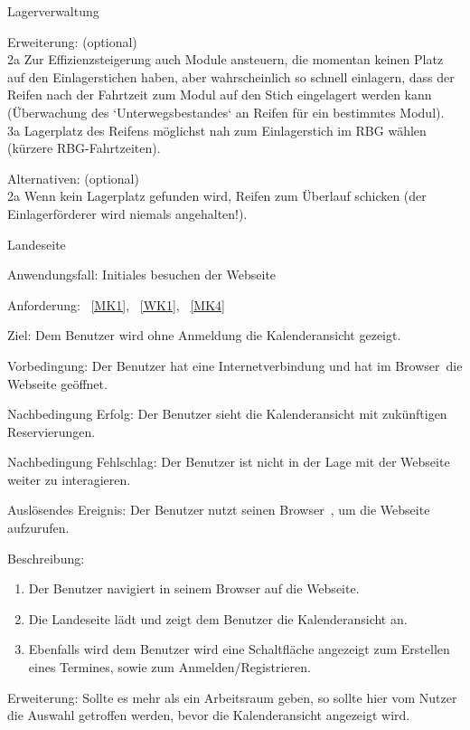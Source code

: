\begin{function}{10}{Lagerverwaltung}
\begin{enumerate}
    \end{enumerate}
    \item[Erweiterung:] (optional)\\
        2a Zur Effizienzsteigerung auch Module ansteuern, die momentan keinen Platz auf
        den Einlagerstichen haben, aber wahrscheinlich so schnell einlagern, dass der
        Reifen nach der Fahrtzeit zum Modul auf den Stich eingelagert werden kann
        (Überwachung des `Unterwegsbestandes` an Reifen für ein bestimmtes
        Modul).\\
        3a Lagerplatz des Reifens möglichst nah zum Einlagerstich im RBG wählen	(kürzere RBG-Fahrtzeiten).
    \item[Alternativen:] (optional)\\
        2a Wenn kein Lagerplatz gefunden wird, Reifen zum Überlauf schicken (der
        Einlagerförderer wird niemals angehalten!).
\end{function}
\fi

\begin{function}{10}{Landeseite}
    \item[Anwendungsfall:] Initiales besuchen der Webseite
    \item[Anforderung:]~\ref{MK1}, ~\ref{WK1}, ~\ref{MK4}
    \item[Ziel:] Dem Benutzer wird ohne Anmeldung die Kalenderansicht gezeigt.
    \item[Vorbedingung:] Der Benutzer hat eine Internetverbindung und hat im \gls{Browser}~die Webseite geöffnet.
    \item[Nachbedingung Erfolg:] Der Benutzer sieht die Kalenderansicht mit zukünftigen Reservierungen.
    \item[Nachbedingung Fehlschlag:] Der Benutzer ist nicht in der Lage mit der Webseite weiter zu interagieren.
    \item[Auslösendes Ereignis:] Der Benutzer nutzt seinen \gls{Browser}~, um die Webseite aufzurufen.
    \item[Beschreibung:]~
    \begin{enumerate}
        \item Der Benutzer navigiert in seinem Browser auf die Webseite.
        \item Die Landeseite lädt und zeigt dem Benutzer die Kalenderansicht an.
        \item Ebenfalls wird dem Benutzer wird eine Schaltfläche angezeigt zum Erstellen eines Termines, sowie zum Anmelden/Registrieren.
    \end{enumerate}
    \item[Erweiterung:] Sollte es mehr als ein Arbeitsraum geben, so sollte hier vom Nutzer die Auswahl getroffen werden, bevor die Kalenderansicht angezeigt wird.
\end{function}

